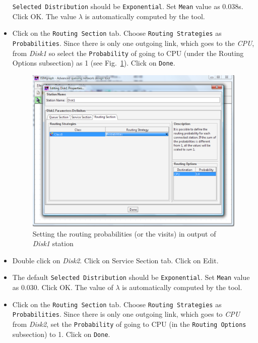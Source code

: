 \begin{itemize}
\texttt{Selected Distribution} should be \texttt{Exponential}. Set
\texttt{Mean} value as 0.038s. Click OK. The value $\lambda$ is
automatically computed by the tool. \item Click on the
\texttt{Routing Section} tab. Choose \texttt{Routing Strategies}
as \texttt{Probabilities}. Since there is only one outgoing link,
which goes to the \emph{CPU}, from \emph{Disk1} so select the
\texttt{Probability} of going to CPU (under the Routing Options
subsection) as 1 (see Fig.~\ref{fig:probDisk1}). Click on
\texttt{Done}.
\begin{figure}[htb]
    \begin{center}
        \includegraphics[scale=.5]{img/jsimg/12.8.eps}
    \end{center}
    \caption{Setting the routing probabilities (or the visits) in output
    of \emph{Disk1} station}
    \label{fig:probDisk1}
\end{figure}
\item Double click on \emph{Disk2}. Click on Service Section tab.
Click on Edit. \item The default \texttt{Selected Distribution}
should be \texttt{Exponential}. Set \texttt{Mean} value as 0.030.
Click OK. The value of $\lambda$ is automatically computed by the
tool. \item Click on the \texttt{Routing Section} tab. Choose
\texttt{Routing Strategies} as \texttt{Probabilities}.  Since
there is only one outgoing link, which goes to \emph{CPU} from
\emph{Disk2}, set the \texttt{Probability} of going to CPU (in the
\texttt{Routing Options} subsection) to 1. Click on \texttt{Done}.
\end{itemize}

